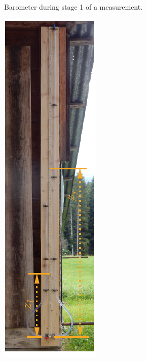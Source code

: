 \documentclass[a4paper,11pt, twocolumn]{article}
\begin{document}
\begin{figure}[h!]
\begin{subfigure}{0.22\textwidth}
		\caption{Barometer during stage 1 of a measurement.}
		\label{fig:meas_stage_1}
	\end{subfigure}
	\hfill
	\begin{subfigure}{0.22\textwidth}
		\centering
		\includegraphics[width=\textwidth]{figures/final.pdf}

\end{subfigure}
\end{figure}
\end{document}
